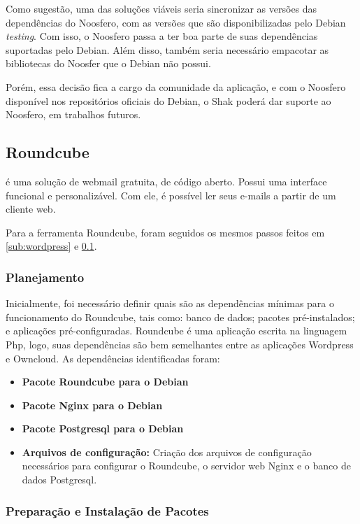Como sugestão, uma das soluções viáveis seria 
sincronizar as versões das dependências do Noosfero, com as versões que são 
disponibilizadas pelo Debian \textit{testing}. Com isso, o 
Noosfero passa a ter boa parte de suas dependências suportadas pelo Debian. Além disso, 
também seria necessário empacotar as bibliotecas do Noosfer que o Debian não possui. 

Porém, essa decisão fica a cargo da comunidade da aplicação, e com o Noosfero disponível
nos repositórios oficiais do Debian, o Shak poderá dar suporte ao Noosfero, 
em trabalhos futuros.

 \subsection{Roundcube}
\label{sub:owncloud}

 é uma solução de webmail gratuita, de código 
aberto. Possui uma interface funcional e personalizável. Com ele, é possível
ler seus e-mails a partir de um cliente web. 

Para a ferramenta Roundcube, foram seguidos os mesmos passos feitos em 
\ref{sub:wordpress} e \ref{sub:owncloud}.

\subsubsection{Planejamento}

Inicialmente, foi necessário definir quais são as dependências
mínimas para o funcionamento do Roundcube, tais como: banco de dados; pacotes
pré-instalados; e aplicações pré-configuradas. Roundcube é uma aplicação escrita
na linguagem Php, logo, suas dependências são bem semelhantes entre as aplicações
Wordpress e Owncloud. As dependências identificadas foram:

\begin{itemize}
   \item \textbf{Pacote Roundcube para o Debian}
   \item \textbf{Pacote Nginx para o Debian}
   \item \textbf{Pacote Postgresql para o Debian}
   \item \textbf{Arquivos de configuração:} Criação dos arquivos de configuração
   necessários para configurar o Roundcube, o servidor web Nginx e o banco de dados
   Postgresql.
\end{itemize}

\subsubsection{Preparação e Instalação de Pacotes}

